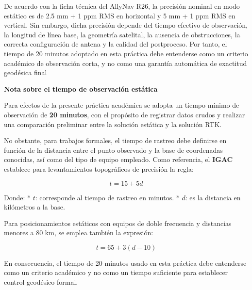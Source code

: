 \documentclass[
  letterpaper,
  DIV=11,
  numbers=noendperiod]{scrartcl}
\begin{document}
De acuerdo con la ficha técnica del AllyNav R26, la precisión nominal en
modo estático es de 2.5 mm + 1 ppm RMS en horizontal y 5 mm + 1 ppm RMS
en vertical. Sin embargo, dicha precisión depende del tiempo efectivo de
observación, la longitud de línea base, la geometría satelital, la
ausencia de obstrucciones, la correcta configuración de antena y la
calidad del postproceso. Por tanto, el tiempo de 20 minutos adoptado en
esta práctica debe entenderse como un criterio académico de observación
corta, y no como una garantía automática de exactitud geodésica final

\begin{tcolorbox}[enhanced jigsaw, colframe=quarto-callout-important-color-frame, bottomtitle=1mm, opacityback=0, toprule=.15mm, bottomrule=.15mm, left=2mm, breakable, rightrule=.15mm, opacitybacktitle=0.6, colback=white, toptitle=1mm, arc=.35mm, title=\textcolor{quarto-callout-important-color}{\faExclamation}\hspace{0.5em}{Important}, leftrule=.75mm, titlerule=0mm, coltitle=black, colbacktitle=quarto-callout-important-color!10!white]

\textbf{Nota sobre el tiempo de observación estática}

Para efectos de la presente práctica académica se adopta un tiempo
mínimo de observación de \textbf{20 minutos}, con el propósito de
registrar datos crudos y realizar una comparación preliminar entre la
solución estática y la solución RTK.

No obstante, para trabajos formales, el tiempo de rastreo debe definirse
en función de la distancia entre el punto observado y la base de
coordenadas conocidas, así como del tipo de equipo empleado. Como
referencia, el \textbf{IGAC} establece para levantamientos topográficos
de precisión la regla:

\[t = 15 + 5d\]

Donde: * \(t\): corresponde al tiempo de rastreo en minutos. * \(d\): es
la distancia en kilómetros a la base.

Para posicionamientos estáticos con equipos de doble frecuencia y
distancias menores a 80 km, se emplea también la expresión:

\[t = 65 + 3(d - 10)\]

En consecuencia, el tiempo de 20 minutos usado en esta práctica debe
entenderse como un criterio académico y no como un tiempo suficiente
para establecer control geodésico formal.

\end{tcolorbox}
\end{document}
